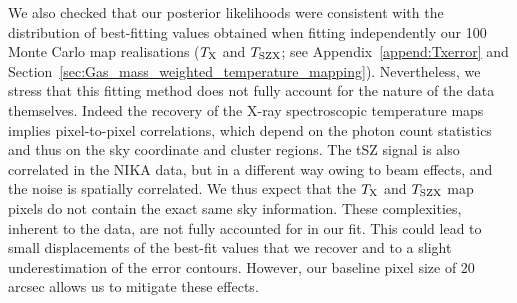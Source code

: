 \documentclass[twocolumn,traditabstract]{aa}
\def\TSZ {T_{\rm SZX}}
\def \TX {T_{\rm X}}
\begin{document}
We also checked that our posterior likelihoods were consistent with the distribution of best-fitting values obtained when fitting independently our 100 Monte Carlo map realisations ($\TX$ and $\TSZ$; see Appendix~\ref{append:Txerror} and Section~\ref{sec:Gas_mass_weighted_temperature_mapping}). Nevertheless, we stress that this fitting method does not fully account for the nature of the data themselves. Indeed the recovery of the X-ray spectroscopic temperature maps implies pixel-to-pixel correlations, which depend on the photon count statistics and thus on the sky coordinate and cluster regions. The tSZ signal is also correlated in the NIKA data, but in a different way owing to beam effects, and the noise is spatially correlated. We thus expect that the $\TX$ and $\TSZ$ map pixels do not contain the exact same sky information. These complexities, inherent to the data, are not fully accounted for in our fit. This could lead to small displacements of the best-fit values that we recover and to a slight underestimation of the error contours. However, our baseline pixel size of 20 arcsec allows us to mitigate these effects.
\end{document}
